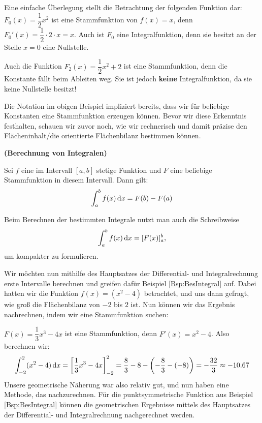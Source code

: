 \documentclass[ngerman, 12pt]{nssheetxea}
\begin{document}
\begin{example}
Eine einfache Überlegung stellt die Betrachtung der folgenden Funktion dar: $F_0(x)=\dfrac{1}{2}x^2$ ist eine Stammfunktion von $f(x)=x$, denn $F_0'(x)=\dfrac{1}{2}\cdot 2 \cdot x = x$. Auch ist $F_0$ eine Integralfunktion, denn sie besitzt an der Stelle $x=0$ eine Nullstelle. \par
Auch die Funktion $F_2(x)=\dfrac{1}{2}x^2+2$ ist eine Stammfunktion, denn die Konstante fällt beim Ableiten weg. Sie ist jedoch \textbf{keine} Integralfunktion, da sie keine Nullstelle besitzt!
\end{example}
Die Notation im obigen Beispiel impliziert bereits, dass wir für beliebige Konstanten eine Stammfunktion erzeugen können. Bevor wir diese Erkenntnis festhalten, schauen wir zuvor noch, wie wir rechnerisch und damit präzise den Flächeninhalt/die orientierte Flächenbilanz bestimmen können. 

\begin{theorem} \textbf{(Berechnung von Integralen)} \par
Sei $f$ eine im Intervall $[a,b]$ stetige Funktion und $F$ eine beliebige Stammfunktion in diesem Intervall. Dann gilt:
\[ \int_a^bf(x)\mathop{}\!\mathrm{d} x = F(b)-F(a)  \]

 
\end{theorem}
Beim Berechnen der bestimmten Integrale nutzt man auch die Schreibweise
\[ \int_a^bf(x)\mathop{}\!\mathrm{d} x = [F(x)]_a^b, \]
um kompakter zu formulieren. 

\begin{example}
Wir möchten nun mithilfe des Hauptsatzes der Differential- und Integralrechnung erste Intervalle berechnen und greifen dafür Beispiel \ref{Bsp:BesIntegral} auf. Dabei hatten wir die Funktion $f(x)=(x^2-4)$ betrachtet, und uns dann gefragt, wie groß die Flächenbilanz von $-2$ bis $2$ ist. Nun können wir das Ergebnis nachrechnen, indem wir eine Stammfunktion suchen: \par
$F(x)=\dfrac{1}{3}x^3-4x$ ist eine Stammfunktion, denn $F'(x)=x^2-4$. Also berechnen wir:
\[ \int_{-2}^2 (x^2-4) \diff x = \mleft[\dfrac{1}{3}x^3-4x\mright]_{-2}^2 = \dfrac{8}{3}-8 - \mleft( - \dfrac{8}{3} - (-8) \mright) = -\dfrac{32}{3} \approx -\num{10,67} \]
Unsere geometrische Näherung war also relativ gut, und nun haben eine Methode, das nachzurechnen. Für die punktsymmetrische Funktion aus Beispiel \ref{Bsp:BesIntegral} können die geometrischen Ergebnisse mittels des Hauptsatzes der Differential- und Integralrechnung nachgerechnet werden.
\end{example}
\end{document}
